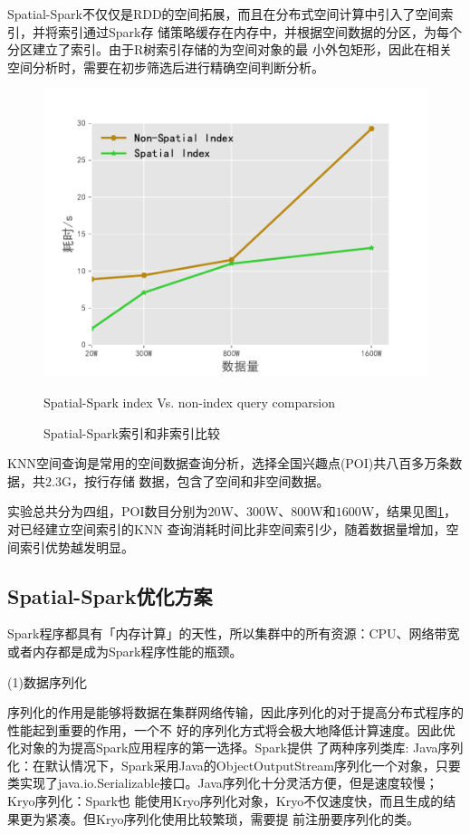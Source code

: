Spatial-Spark不仅仅是RDD的空间拓展，而且在分布式空间计算中引入了空间索引，并将索引通过Spark存
储策略缓存在内存中，并根据空间数据的分区，为每个分区建立了索引。由于R树索引存储的为空间对象的最
小外包矩形，因此在相关空间分析时，需要在初步筛选后进行精确空间判断分析。
\begin{figure}
  \centering
  \includegraphics[scale=0.7]{figures/index.pdf} \\
  \caption{Spatial-Spark索引和非索引比较}{Spatial-Spark index Vs. non-index query comparsion}
  \label{fig:index}
\end{figure}

KNN空间查询是常用的空间数据查询分析，选择全国兴趣点(POI)共八百多万条数据，共$2.3$G，按行存储
数据，包含了空间和非空间数据。

实验总共分为四组，POI数目分别为$20$W、$300$W、$800$W和$1600$W，结果见图\ref{fig:index}，对已经建立空间索引的KNN
查询消耗时间比非空间索引少，随着数据量增加，空间索引优势越发明显。
\subsection{Spatial-Spark优化方案}

Spark程序都具有「内存计算」的天性，所以集群中的所有资源：CPU、网络带宽或者内存都是成为Spark程序性能的瓶颈。

(1)数据序列化

序列化的作用是能够将数据在集群网络传输，因此序列化的对于提高分布式程序的性能起到重要的作用，一个不
好的序列化方式将会极大地降低计算速度。因此优化对象的为提高Spark应用程序的第一选择\cite{Zhao2016An}。Spark提供
了两种序列类库:  Java序列化：在默认情况下，Spark采用Java的ObjectOutputStream序列化一个对象，只要
类实现了java.io.Serializable接口。Java序列化十分灵活方便，但是速度较慢；Kryo序列化：Spark也
能使用Kryo序列化对象，Kryo不仅速度快，而且生成的结果更为紧凑。但Kryo序列化使用比较繁琐，需要提
前注册要序列化的类。

